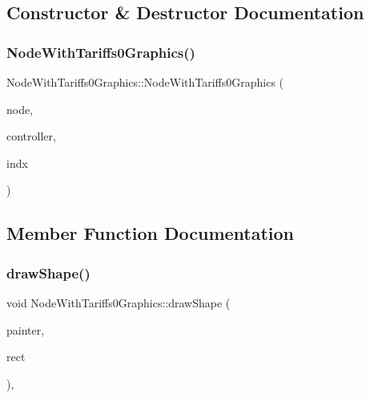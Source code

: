 \subsection{Constructor \& Destructor Documentation}
\mbox{\label{class_node_with_tariffs0_graphics_a6cc528a84667ebc35afe881e16417b89}} 
\subsubsection{\texorpdfstring{NodeWithTariffs0Graphics()}{NodeWithTariffs0Graphics()}}
{\footnotesize\ttfamily Node\+With\+Tariffs0\+Graphics\+::\+Node\+With\+Tariffs0\+Graphics (\begin{DoxyParamCaption}\item[{\mbox{\hyperlink{class_node_data}{Node\+Data}} $\ast$}]{node,  }\item[{\mbox{\hyperlink{class_map_objects_controller}{Map\+Objects\+Controller}} $\ast$}]{controller,  }\item[{int}]{indx }\end{DoxyParamCaption})\hspace{0.3cm}{\ttfamily [inline]}}



\subsection{Member Function Documentation}
\mbox{\label{class_node_with_tariffs0_graphics_a63909073db786886a6b5c57bca9f875d}} 
\subsubsection{\texorpdfstring{drawShape()}{drawShape()}}
{\footnotesize\ttfamily void Node\+With\+Tariffs0\+Graphics\+::draw\+Shape (\begin{DoxyParamCaption}\item[{Q\+Painter \&}]{painter,  }\item[{const qmapcontrol\+::\+Rect\+World\+Px \&}]{rect }\end{DoxyParamCaption})\hspace{0.3cm}{\ttfamily [protected]}, {\ttfamily [virtual]}}



